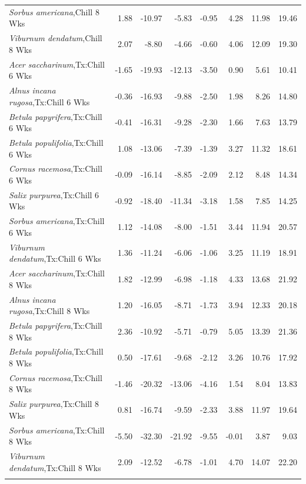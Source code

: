 \documentclass{article}\usepackage[]{graphicx}\usepackage[]{color}
\begin{document}
\begin{longtable}{lrrrrrrr}
  \textit{Sorbus americana},Chill 8 Wks & 1.88 & -10.97 & -5.83 & -0.95 & 4.28 & 11.98 & 19.46 \\ 
  \textit{Viburnum dendatum},Chill 8 Wks & 2.07 & -8.80 & -4.66 & -0.60 & 4.06 & 12.09 & 19.30 \\ 
  \textit{Acer saccharinum},Tx:Chill 6 Wks & -1.65 & -19.93 & -12.13 & -3.50 & 0.90 & 5.61 & 10.41 \\ 
  \textit{Alnus incana rugosa},Tx:Chill 6 Wks & -0.36 & -16.93 & -9.88 & -2.50 & 1.98 & 8.26 & 14.80 \\ 
  \textit{Betula papyrifera},Tx:Chill 6 Wks & -0.41 & -16.31 & -9.28 & -2.30 & 1.66 & 7.63 & 13.79 \\ 
  \textit{Betula populifolia},Tx:Chill 6 Wks & 1.08 & -13.06 & -7.39 & -1.39 & 3.27 & 11.32 & 18.61 \\ 
  \textit{Cornus racemosa},Tx:Chill 6 Wks & -0.09 & -16.14 & -8.85 & -2.09 & 2.12 & 8.48 & 14.34 \\ 
  \textit{Salix purpurea},Tx:Chill 6 Wks & -0.92 & -18.40 & -11.34 & -3.18 & 1.58 & 7.85 & 14.25 \\ 
  \textit{Sorbus americana},Tx:Chill 6 Wks & 1.12 & -14.08 & -8.00 & -1.51 & 3.44 & 11.94 & 20.57 \\ 
  \textit{Viburnum dendatum},Tx:Chill 6 Wks & 1.36 & -11.24 & -6.06 & -1.06 & 3.25 & 11.19 & 18.91 \\ 
  \textit{Acer saccharinum},Tx:Chill 8 Wks & 1.82 & -12.99 & -6.98 & -1.18 & 4.33 & 13.68 & 21.92 \\ 
  \textit{Alnus incana rugosa},Tx:Chill 8 Wks & 1.20 & -16.05 & -8.71 & -1.73 & 3.94 & 12.33 & 20.18 \\ 
  \textit{Betula papyrifera},Tx:Chill 8 Wks & 2.36 & -10.92 & -5.71 & -0.79 & 5.05 & 13.39 & 21.36 \\ 
  \textit{Betula populifolia},Tx:Chill 8 Wks & 0.50 & -17.61 & -9.68 & -2.12 & 3.26 & 10.76 & 17.92 \\ 
  \textit{Cornus racemosa},Tx:Chill 8 Wks & -1.46 & -20.32 & -13.06 & -4.16 & 1.54 & 8.04 & 13.83 \\ 
  \textit{Salix purpurea},Tx:Chill 8 Wks & 0.81 & -16.74 & -9.59 & -2.33 & 3.88 & 11.97 & 19.64 \\ 
  \textit{Sorbus americana},Tx:Chill 8 Wks & -5.50 & -32.30 & -21.92 & -9.55 & -0.01 & 3.87 & 9.03 \\ 
  \textit{Viburnum dendatum},Tx:Chill 8 Wks & 2.09 & -12.52 & -6.78 & -1.01 & 4.70 & 14.07 & 22.20 \\ 
   \hline
\hline
\label{tab:suppmodgs}
\end{longtable}
\end{document}
